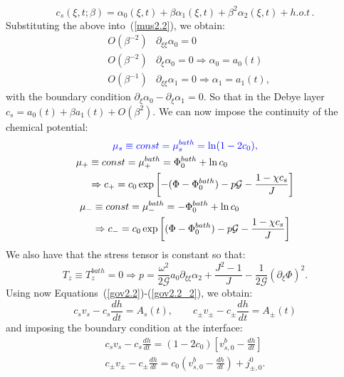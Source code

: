 \documentclass[12pt]{extarticle}
\begin{document}
\begin{equation}
c_s(\xi,t;\beta) = \alpha_0(\xi,t) + \beta \alpha_1(\xi,t) + \beta^2 \alpha_2(\xi,t)+ h.o.t\,. 
\end{equation}
Substituting the above into~(\ref{mus2.2}), we obtain:
\begin{eqnarray}
&O(\beta^{-2})& \partial_{\xi\xi}\alpha_0=0 \label{cond1}\\
&O(\beta^{-2})& \partial_{\xi}\alpha_0=0 \Rightarrow \alpha_0=a_0(t) \\
&O(\beta^{-1})& \partial_{\xi\xi}\alpha_1=0 \Rightarrow \alpha_1=a_1(t)\label{cond2},
\end{eqnarray} 
with the boundary condition $\partial_{\xi} \alpha_0-\partial_\xi \alpha_1=0$. So that in the Debye layer $c_s= a_0(t) + \beta a_1(t) + O(\beta^2)$.
\color{black}
We can now impose the continuity of the chemical potential:
\begin{gather}
\color{blue}\mu_s \equiv const = \mu^{bath}_s= \ln(1-2c_0),\\
\begin{aligned}
\mu_+ &\equiv const = \mu^{bath}_+=  \Phi_0^{bath} + \ln c_0 \\&\Rightarrow c_+=c_0\exp\left[-(\Phi-\Phi_0^{bath})-p\mathcal{G}-\frac{1-\chi c_s}{J}\right]
\end{aligned}\\
\begin{aligned}
\mu_- &\equiv const = \mu^{bath}_-= - \Phi_0^{bath} + \ln c_0\\ &\Rightarrow c_-=c_0\exp\left[(\Phi-\Phi_0^{bath})-p\mathcal{G}-\frac{1-\chi c_s}{J}\right]
\end{aligned}
\end{gather}
We also have that the stress tensor is constant so that:
\begin{equation}
T_z\equiv T^{bath}_z=0 \Rightarrow p = \frac{\omega^2}{2\mathcal{G}} a_0\partial_{\xi\xi}\alpha_2+\frac{J^2-1}{J}-\frac{1}{2\mathcal{G}} (\partial_\xi \Phi)^2.
\end{equation}
Using now Equations~(\ref{gov2.2})-(\ref{gov2.2_2}), we obtain:
\begin{equation}
c_s v_s - c_s \frac{dh}{dt}=A_s(t), \qquad c_\pm v_\pm - c_\pm \frac{dh}{dt}=A_\pm(t)
\end{equation}
and imposing the boundary condition at the interface:
\begin{gather}
c_s v_s - c_s \frac{dh}{dt}=(1-2c_0)\left[v^b_{s,0}-\frac{dh}{dt}\right]\\
c_\pm v_\pm - c_\pm \frac{dh}{dt}=c_0\left( v^b_{s,0} - \frac{dh}{dt}\right)  +j^0_{\pm,0}.
\end{gather}
\end{document}
